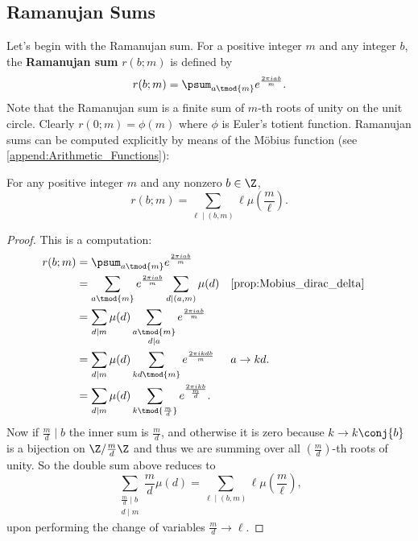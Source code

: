       \subsection*{Ramanujan Sums}
        Let's begin with the Ramanujan sum. For a positive integer $m$ and any integer $b$, the \textbf{Ramanujan sum} $r(b;m)$ is defined by
        \[
          r(b;m) = \psum_{a \tmod{m}}e^{\frac{2\pi iab}{m}}.
        \]
        Note that the Ramanujan sum is a finite sum of $m$-th roots of unity on the unit circle. Clearly $r(0;m) = \phi(m)$ where $\phi$ is Euler's totient function. Ramanujan sums can be computed explicitly by means of the M\"obius function (see \cref{append:Arithmetic_Functions}):

        \begin{proposition}\label{prop:Ramanujan_sum_evaluation}
          For any positive integer $m$ and any nonzero $b \in \Z$,
          \[
            r(b;m) = \sum_{\ell \mid (b,m)}\ell\mu\left(\frac{m}{\ell}\right).
          \]
        \end{proposition}
        \begin{proof}
          This is a computation:
          \begin{align*}
            r(b;m) &= \psum_{a \tmod{m}}e^{\frac{2\pi iab}{m}} \\
            &= \sum_{a \tmod{m}}e^{\frac{2\pi iab}{m}}\sum_{d \mid (a,m)}\mu(d) && \text{\cref{prop:Mobius_dirac_delta}} \\
            &= \sum_{d \mid m}\mu(d)\sum_{\substack{a \tmod{m} \\ d \mid a}}e^{\frac{2\pi iab}{m}} \\
            &= \sum_{d \mid m}\mu(d)\sum_{kd \tmod{m}}e^{\frac{2\pi ikdb}{m}} && \text{$a \to kd$.} \\
            &= \sum_{d \mid m}\mu(d)\sum_{k \tmod{\frac{m}{d}}}e^{\frac{2\pi ik b}{\frac{m}{d}}}.
          \end{align*}
          Now if $\frac{m}{d} \mid b$ the inner sum is $\frac{m}{d}$, and otherwise it is zero because $k \to k\conj{b}$ is a bijection on $\Z/\frac{m}{d}\Z$ and thus we are summing over all $\left(\frac{m}{d}\right)$-th roots of unity. So the double sum above reduces to
          \[
            \sum_{\substack{\frac{m}{d} \mid b \\ d \mid m}}\frac{m}{d}\mu(d) = \sum_{\ell \mid (b,m)}\ell\mu\left(\frac{m}{\ell}\right),
          \]
          upon performing the change of variables $\frac{m}{d} \to \ell$.
        \end{proof}

